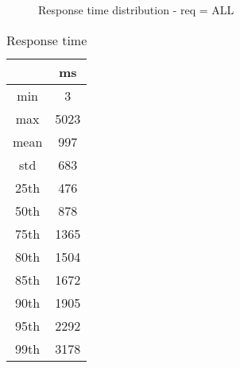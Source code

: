 \begin{minipage}{0.75\linewidth}
\begin{figure}[h]
\begin{adjustbox}{max width=1.0\linewidth, keepaspectratio}
  \end{adjustbox}
  \caption{Response time distribution - req = ALL}
\end{figure}
\end{minipage}\hfill\begin{minipage}{0.18\linewidth}
\begin{table}[h]
\begin{tabular}{|cc|}
\hline
\textbf{} & \textbf{ms}\\ \hline
 \Xhline{0.005\arrayrulewidth}
min & 3\\
 \Xhline{0.005\arrayrulewidth}
max & 5023\\
 \Xhline{0.005\arrayrulewidth}
mean & 997\\
 \Xhline{0.005\arrayrulewidth}
std & 683\\
\hline
\hline
 \Xhline{0.005\arrayrulewidth}
25th & 476\\
 \Xhline{0.005\arrayrulewidth}
50th & 878\\
 \Xhline{0.005\arrayrulewidth}
75th & 1365\\
 \Xhline{0.005\arrayrulewidth}
80th & 1504\\
 \Xhline{0.005\arrayrulewidth}
85th & 1672\\
 \Xhline{0.005\arrayrulewidth}
90th & 1905\\
 \Xhline{0.005\arrayrulewidth}
95th & 2292\\
 \Xhline{0.005\arrayrulewidth}
99th & 3178\\
\hline
\end{tabular}
\caption{Response time}
\end{table}
\end{minipage}\hfill